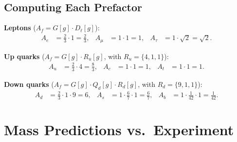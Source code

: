 \documentclass[11pt,a4paper]{article}
\theoremstyle{remark}
\begin{document}
\subsection{Computing Each Prefactor}

\noindent\textbf{Leptons} ($A_f = G[g] \cdot D_\ell[g]$):
\begin{align}
A_e &= \tfrac{2}{3} \cdot 1 = \tfrac{2}{3}, &
A_\mu &= 1 \cdot 1 = 1, &
A_\tau &= 1 \cdot \sqrt{2} = \sqrt{2}.
\end{align}

\noindent\textbf{Up quarks} ($A_f = G[g] \cdot R_u[g]$, with $R_u = \{4, 1, 1\}$):
\begin{align}
A_u &= \tfrac{2}{3} \cdot 4 = \tfrac{8}{3}, &
A_c &= 1 \cdot 1 = 1, &
A_t &= 1 \cdot 1 = 1.
\end{align}

\noindent\textbf{Down quarks} ($A_f = G[g] \cdot Q_d[g] \cdot R_d[g]$, with $R_d = \{9, 1, 1\}$):
\begin{align}
A_d &= \tfrac{2}{3} \cdot 1 \cdot 9 = 6, &
A_s &= 1 \cdot \tfrac{6}{7} \cdot 1 = \tfrac{6}{7}, &
A_b &= 1 \cdot \tfrac{1}{42} \cdot 1 = \tfrac{1}{42}.
\end{align}


\section{Mass Predictions vs.\ Experiment}
\label{sec:masses}
\end{document}
